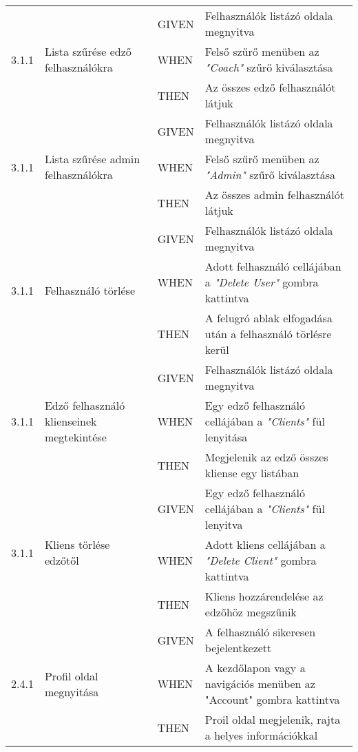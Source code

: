 \begin{center}
\begin{longtable}{ | p{} | p{} | p{} | p{} | }
			\multirow{3}{*}{3.1.1} 
			& \multirow{3}{=}{Lista szűrése edző felhasználókra} 
			& GIVEN 
			& Felhasználók listázó oldala megnyitva \\
			\cline{3-4}
			& & WHEN 
			& Felső szűrő menüben az \emph{"Coach"} szűrő kiválasztása \\
			\cline{3-4}
			& & THEN 
			& Az összes edző felhasználót látjuk \\
			\hline

			\multirow{3}{*}{3.1.1} 
			& \multirow{3}{=}{Lista szűrése admin felhasználókra} 
			& GIVEN 
			& Felhasználók listázó oldala megnyitva \\
			\cline{3-4}
			& & WHEN 
			& Felső szűrő menüben az \emph{"Admin"} szűrő kiválasztása \\
			\cline{3-4}
			& & THEN 
			& Az összes admin felhasználót látjuk \\
			\hline

			\multirow{3}{*}{3.1.1} 
			& \multirow{3}{=}{Felhasználó törlése} 
			& GIVEN 
			& Felhasználók listázó oldala megnyitva \\
			\cline{3-4}
			& & WHEN 
			& Adott felhasználó cellájában a \emph{"Delete User"} gombra kattintva \\
			\cline{3-4}
			& & THEN 
			& A felugró ablak elfogadása után a felhasználó törlésre kerül \\
			\hline

			\multirow{3}{*}{3.1.1} 
			& \multirow{3}{=}{Edző felhasználó klienseinek megtekintése} 
			& GIVEN 
			& Felhasználók listázó oldala megnyitva \\
			\cline{3-4}
			& & WHEN 
			& Egy edző felhasználó cellájában a \emph{"Clients"} fül lenyitása \\
			\cline{3-4}
			& & THEN 
			& Megjelenik az edző összes kliense egy listában \\
			\hline

			\multirow{3}{*}{3.1.1} 
			& \multirow{3}{=}{Kliens törlése edzőtől} 
			& GIVEN 
			& Egy edző felhasználó cellájában a \emph{"Clients"} fül lenyitva \\
			\cline{3-4}
			& & WHEN 
			& Adott kliens cellájában a \emph{"Delete Client"} gombra kattintva \\
			\cline{3-4}
			& & THEN 
			& Kliens hozzárendelése az edzőhöz megszűnik \\
			\hline






			\multirow{3}{*}{2.4.1} 
			& \multirow{3}{=}{Profil oldal megnyitása} 
			& GIVEN 
			& A felhasználó sikeresen bejelentkezett \\
			\cline{3-4}
			& & WHEN 
			& A kezdőlapon vagy a navigációs menüben az "Account" gombra kattintva \\
			\cline{3-4}
			& & THEN 
			& Proil oldal megjelenik, rajta a helyes információkkal \\
			\hline


\end{longtable}
\end{center}
